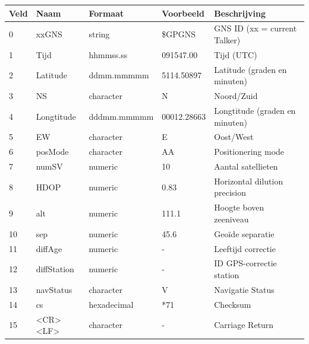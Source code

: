 \begin{tabularx}{\textwidth}{| l | l | l | l | X |}
    \hline
    \textbf{Veld} & \textbf{Naam} & \textbf{Formaat} & \textbf{Voorbeeld} & \textbf{Beschrijving}          \\ \hline
    0             & xxGNS         & string           & \$GPGNS            & GNS ID (xx = current Talker)   \\ \hline
    1             & Tijd          & hhmmss.ss        & 091547.00          & Tijd (UTC)                     \\ \hline
    2             & Latitude      & ddmm.mmmmm       & 5114.50897         & Latitude (graden en minuten)   \\ \hline
    3             & NS            & character        & N                  & Noord/Zuid                     \\ \hline
    4             & Longtitude    & dddmm.mmmmm      & 00012.28663        & Longtitude (graden en minuten) \\ \hline
    5             & EW            & character        & E                  & Oost/West                      \\ \hline
    6             & posMode       & character        & AA                 & Positionering mode             \\ \hline
    7             & numSV         & numeric          & 10                 & Aantal satellieten             \\ \hline
    8             & HDOP          & numeric          & 0.83               & Horizontal dilution precision  \\ \hline
    9             & alt           & numeric          & 111.1              & Hoogte boven zeeniveau         \\ \hline
    10            & sep           & numeric          & 45.6               & Geoïde separatie               \\ \hline
    11            & diffAge       & numeric          & -                  & Leeftijd correctie             \\ \hline
    12            & diffStation   & numeric          & -                  & ID GPS-correctie station       \\ \hline
    13            & navStatus     & character        & V                  & Navigatie Status               \\ \hline
    14            & cs            & hexadecimal      & *71                & Checksum                       \\ \hline
    15            & <CR><LF>      & character        & -                  & Carriage Return                \\ \hline
\end{tabularx}
\citep[p. 116]{UBlox8}\\

